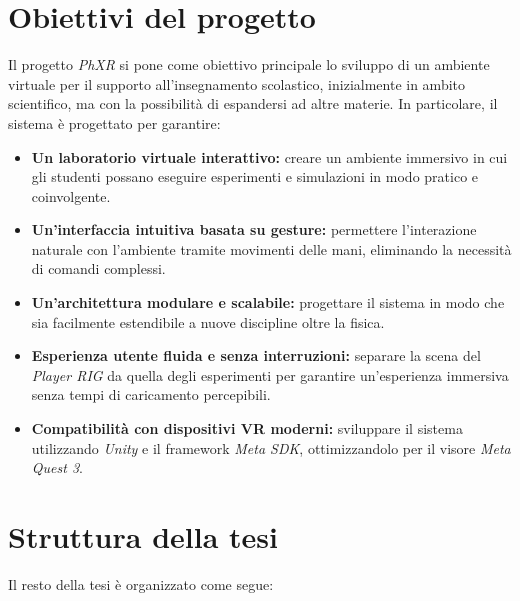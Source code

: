 \section{Obiettivi del progetto}
\label{sec:introduzione_obiettivi}

Il progetto \emph{PhXR} si pone come obiettivo principale lo sviluppo di un
ambiente virtuale per il supporto all’insegnamento scolastico, inizialmente in ambito
scientifico, ma con la possibilità di espandersi ad altre materie. In particolare,
il sistema è progettato per garantire:

\begin{itemize}
  \item \textbf{Un laboratorio virtuale interattivo:} creare un ambiente
    immersivo in cui gli studenti possano eseguire esperimenti e simulazioni in
    modo pratico e coinvolgente.

  \item \textbf{Un'interfaccia intuitiva basata su gesture:} permettere l'interazione
    naturale con l'ambiente tramite movimenti delle mani, eliminando la necessità
    di comandi complessi.

  \item \textbf{Un'architettura modulare e scalabile:} progettare il sistema in
    modo che sia facilmente estendibile a nuove discipline oltre la fisica.

  \item \textbf{Esperienza utente fluida e senza interruzioni:} separare la
    scena del \emph{Player RIG} da quella degli esperimenti per garantire un'esperienza
    immersiva senza tempi di caricamento percepibili.

  \item \textbf{Compatibilità con dispositivi VR moderni:} sviluppare il sistema
    utilizzando \emph{Unity} e il framework \emph{Meta SDK}, ottimizzandolo per il
    visore \emph{Meta Quest 3}.
\end{itemize}

\section{Struttura della tesi}
\label{sec:introduzione_struttura}

Il resto della tesi è organizzato come segue:

